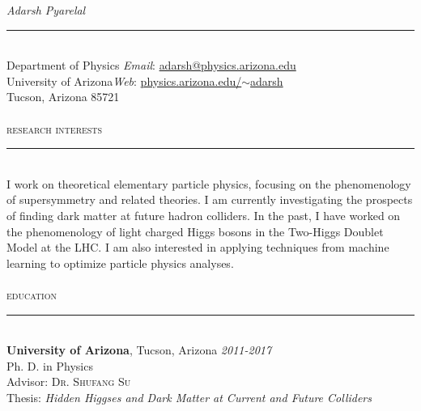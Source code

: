 \documentclass[10pt]{report}
\newcommand{\HRule}{\rule[2mm]{\linewidth}{0.1mm}}
\begin{document}
\huge\textit{Adarsh Pyarelal}\\
\HRule\\
\small Department of Physics \hfill \textit{Email}: \textsf{\href{mailto:adarsh@email.arizona.edu}{adarsh@physics.arizona.edu}}\\ University of Arizona\hfill \textit{Web}: \textsf{\href{http://www.physics.arizona.edu/~adarsh}{physics.arizona.edu/$\sim$adarsh}}\\
Tucson, Arizona 85721\\\\
\large\textsc{research interests}\\
\HRule\\
\small I work on theoretical elementary particle physics, focusing on the phenomenology of supersymmetry and related theories. I am currently investigating the prospects of finding dark matter at future hadron colliders. In the past, I have worked on the phenomenology of light charged Higgs bosons in the Two-Higgs Doublet Model at the LHC. I am also interested in applying techniques from machine learning to optimize particle physics analyses.  
\\\\
\large\textsc{education}\\
\HRule\\
\small \textsf{\textbf{University of Arizona}}, \textsf{\normalsize Tucson, Arizona} \hfill \textit{\small 2011-2017}\\
\small Ph. D. in Physics\\
Advisor: \textsc{\small Dr. Shufang Su}\\
Thesis: \emph{Hidden Higgses and Dark Matter at Current and Future Colliders}
\end{document}
